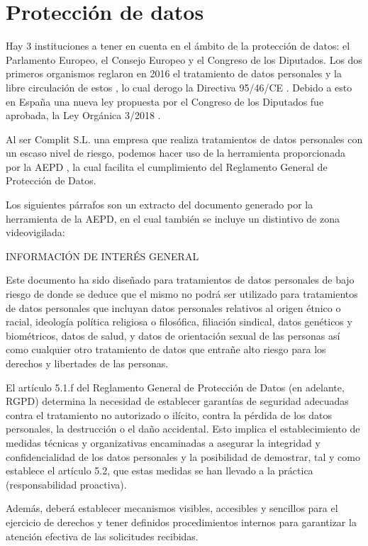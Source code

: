 \documentclass[11pt]{article}
\begin{document}
\section{Protección de datos}
\label{sec:orgdc45215}

Hay 3 instituciones a tener en cuenta en el ámbito de la protección de datos: el Parlamento Europeo, el Consejo Europeo y el Congreso de los Diputados. Los dos primeros organismos reglaron en 2016 el tratamiento de datos personales y la libre circulación de estos \cite{pae2016}, lo cual derogo la  Directiva 95/46/CE \cite{pae1995}. Debido a esto en España una nueva ley propuesta por el Congreso de los Diputados fue aprobada, la Ley Orgánica 3/2018 \cite{boelopd2018}.

Al ser Complit S.L. una empresa que realiza tratamientos de datos personales con un escaso nivel de riesgo, podemos hacer uso de la herramienta proporcionada por la AEPD \cite{aepd2020}, la cual facilita el cumplimiento del Reglamento General de Protección de Datos.

Los siguientes párrafos son un extracto del documento generado por la herramienta de la AEPD, en el cual también se incluye un distintivo de zona videovigilada:

INFORMACIÓN DE INTERÉS GENERAL

Este documento ha sido diseñado para tratamientos de datos personales de bajo riesgo de donde se deduce que el mismo no podrá ser utilizado para tratamientos de datos personales que incluyan datos personales  relativos al origen étnico o racial, ideología política religiosa o filosófica, filiación sindical, datos genéticos y biométricos, datos de salud, y datos de orientación sexual de las personas así como cualquier otro tratamiento de datos que entrañe alto riesgo para los derechos y libertades de las personas.

El artículo 5.1.f del Reglamento General de Protección de Datos (en adelante, RGPD) determina la necesidad de establecer garantías de seguridad adecuadas contra el tratamiento no autorizado o ilícito, contra la pérdida de los datos personales, la destrucción o el daño accidental. Esto implica el establecimiento de medidas técnicas y organizativas encaminadas a asegurar la integridad y confidencialidad de los datos personales y la posibilidad de demostrar, tal y como establece el artículo 5.2, que estas medidas se han llevado a la práctica (responsabilidad proactiva).

Además, deberá establecer mecanismos visibles, accesibles y sencillos para el ejercicio de derechos y tener definidos procedimientos internos para garantizar la atención efectiva de las solicitudes recibidas.
\end{document}
